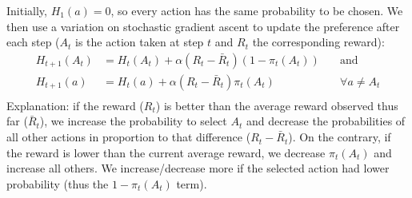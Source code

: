 Initially, $H_1(a) = 0$, so every action has the same probability to be chosen.
We then use a variation on stochastic gradient ascent to update the preference after each step ($A_t$ is the action taken at step $t$ and $R_t$ the corresponding reward):
\begin{align*}
H_{t+1}(A_t) &= H_t(A_t) + \alpha (R_t - \bar{R}_t) (1 - \pi_t(A_t)) \quad & \text{and} \\
H_{t+1}(a)   &= H_t(a) + \alpha (R_t - \bar{R}_t) \pi_t(A_t) \quad & \forall a \neq A_t \\
\end{align*}
Explanation: if the reward ($R_t$) is better than the average reward observed thus far ($\bar{R}_t$), we increase the probability to select $A_t$ and decrease the probabilities of all other actions in proportion to that difference ($R_t - \bar{R}_t$).
On the contrary, if the reward is lower than the current average reward, we decrease $\pi_t(A_t)$ and increase all others.
We increase/decrease more if the selected action had lower probability (thus the $1 - \pi_t(A_t)$ term).


